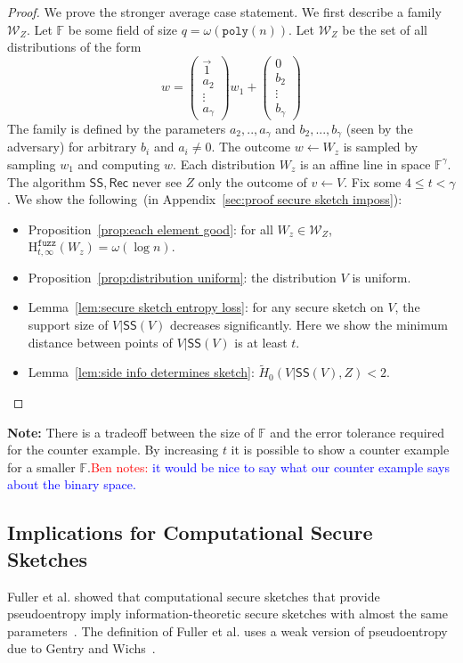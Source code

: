\documentclass[11pt]{article}
\newcommand{\apref}[1]{\mbox{Appendix~\ref{#1}}}
\newcommand{\lemref}[1]{\mbox{Lemma~\ref{#1}}}
\newcommand{\propref}[1]{\mbox{Proposition~\ref{#1}}}
\newcommand{\class}[1]{{\ensuremath{\mathsf{#1}}}}
\newcommand{\sketch}{\ensuremath{\class{SS}}\xspace}
\newcommand{\rec}{\ensuremath{\class{Rec}}\xspace}
\newcommand{\poly}{\ensuremath{\mathtt{poly}}\xspace}
\newcommand{\Hfuzz}{\mathrm{H}^{\mathtt{fuzz}}_{t,\infty}}
\newcommand{\authnote}[2]{{\textcolor{red}{\textsf{#1 notes: }\textcolor{blue}{ #2}}\marginpar{\textcolor{red}{\textbf{!!!!!}}}}}
\newcommand{\authnote}[2]{}
\newcommand{\bnote}[1]{{\authnote{Ben}{#1}}}
\begin{document}
\begin{proof}
We prove the stronger average case statement.
We first describe a family $\mathcal{W}_Z$.  Let $\mathbb{F}$ be some field of size $q =\omega(\poly(n))$.  
Let $\mathcal{W}_Z$ be the set of all distributions of the form 
\[w =  \begin{pmatrix} \vec{1} \\a_2  \\ \vdots \\ a_{\gamma} \end{pmatrix} w_1 + \begin{pmatrix} 0  \\ 
b_2\\ \vdots \\ b_{\gamma} \end{pmatrix} 
\]
The family is defined by the parameters $a_2,.., a_\gamma$ and $b_2,..., b_\gamma$ (seen by the adversary) for arbitrary $b_i$ and $a_i\neq 0$.  The outcome $w\leftarrow W_z$ is sampled by sampling $w_1$ and computing $w$.  Each distribution $W_z$ is an affine line in space $\mathbb{F}^\gamma$. The algorithm $\sketch, \rec$ never see $Z$ only the outcome of $v\leftarrow V$.
Fix some $4\le t < \gamma$.
We show the following~(in \apref{sec:proof secure sketch imposs}):

\begin{itemize}
\item \propref{prop:each element good}: for all $W_z\in \mathcal{W}_Z$, $\Hfuzz(W_z) = \omega (\log n)$. 
\item \propref{prop:distribution uniform}: the distribution $V$ is uniform.
\item \lemref{lem:secure sketch entropy loss}: for any secure sketch on $V$, the support size of $V | \sketch(V)$ decreases significantly.  Here we show the minimum distance between points of $V|\sketch(V)$ is at least $t$.
\item \lemref{lem:side info determines sketch}:  $\tilde{H}_0(V | \sketch(V), Z) < 2$.
\end{itemize}
\end{proof}
\noindent
\textbf{Note:} There is a tradeoff between the size of $\mathbb{F}$ and the error tolerance required for the counter example.  By increasing $t$ it is possible to show a counter example for a smaller $\mathbb{F}$.\bnote{it would be nice to say what our counter example says about the binary space.}
\subsection{Implications for Computational Secure Sketches}
\label{sec:feas comp sec sketch}
Fuller et al. showed that computational secure sketches that provide pseudoentropy imply information-theoretic secure sketches with almost the same parameters~\cite[Corollary 3.8]{fuller2013computational}.  %
The definition of Fuller et al. uses a weak version of pseudoentropy~\cite{DBLP:journals/siamcomp/HastadILL99} due to Gentry and Wichs~\cite{gentry2011separating}.
\end{document}
